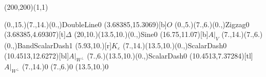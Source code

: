 \unitlength=1bp%

\begin{feynartspicture}(200,200)(1,1)

\FADiagram{}
\FAProp(0.,15.)(7.,14.)(0.,){DoubleLine}{0}
\FALabel(3.68385,15.3069)[b]{$O$}
\FAProp(0.,5.)(7.,6.)(0.,){Zigzag}{0}
\FALabel(3.68385,4.69307)[t]{$\Delta$}
\FAProp(20,10.)(13.5,10.)(0.,){Sine}{0}
\FALabel(16.75,11.07)[b]{$A|_V$}
\FAProp(7.,14.)(7.,6.)(0.,){BandScalarDash}{1}
\FALabel(5.93,10.)[r]{$K_\varepsilon$}
\FAProp(7.,14.)(13.5,10.)(0.,){ScalarDash}{0}
\FALabel(10.4513,12.6272)[bl]{$A|_{W^\perp}$}
\FAProp(7.,6.)(13.5,10.)(0.,){ScalarDash}{0}
\FALabel(10.4513,7.37284)[tl]{$A|_{W^\perp}$}
\FAVert(7.,14.){0}
\FAVert(7.,6.){0}
\FAVert(13.5,10.){0}
\end{feynartspicture}

